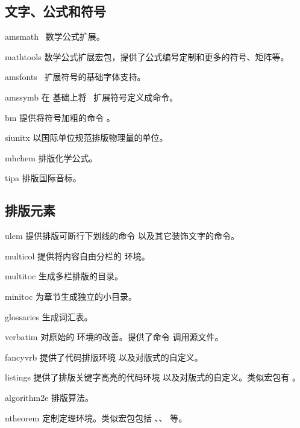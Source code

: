 \subsection{文字、公式和符号}\label{subsec:text-math-symbols}

\begin{pkglist}
  \item[amsmath]  \AmS\ 数学公式扩展。
  \item[mathtools] 数学公式扩展宏包，提供了公式编号定制和更多的符号、矩阵等。
  \item[amsfonts] \AmS\ 扩展符号的基础字体支持。
  \item[amssymb]  在  基础上将 \AmS\ 扩展符号定义成命令。
  \item[bm]       提供将符号加粗的命令 。
  \item[siunitx]  以国际单位规范排版物理量的单位。
  \item[mhchem]   排版化学公式。
  \item[tipa]     排版国际音标。
\end{pkglist}

\subsection{排版元素}\label{subsec:pkg-elements}

\begin{pkglist}
  \item[ulem]     提供排版可断行下划线的命令  以及其它装饰文字的命令。
  \item[multicol] 提供将内容自由分栏的  环境。
  \item[multitoc] 生成多栏排版的目录。
  \item[minitoc]  为章节生成独立的小目录。
  \item[glossaries] 生成词汇表。
  \item[verbatim] 对原始的  环境的改善。提供了命令  调用源文件。
  \item[fancyvrb] 提供了代码排版环境  以及对版式的自定义。
  \item[listings] 提供了排版关键字高亮的代码环境  以及对版式的自定义。类似宏包有 。
  \item[algorithm2e] 排版算法。
  \item[ntheorem] 定制定理环境。类似宏包包括 、、 等。
\end{pkglist}

